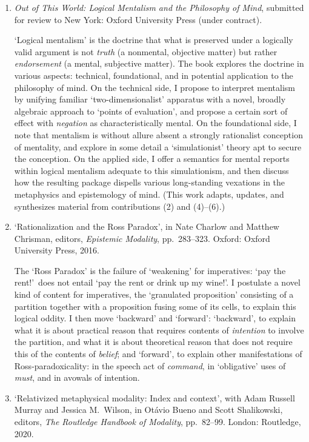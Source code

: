 \documentclass[12pt]{article}
\begin{document}
\begin{enumerate}
	\item \emph{Out of This World: Logical Mentalism and the Philosophy of Mind}, submitted for review to New York: Oxford University Press (under contract).
	
	`Logical mentalism' is the doctrine that what is preserved under a logically valid argument is not \emph{truth} (a nonmental, objective matter) but rather \emph{endorsement} (a mental, subjective matter). The book explores the doctrine in various aspects: technical, foundational, and in potential application to the philosophy of mind. On the technical side, I propose to interpret mentalism by unifying familiar `two-dimensionalist' apparatus with a novel, broadly algebraic approach to `points of evaluation', and propose a certain sort of effect with \emph{negation} as characteristically mental. On the foundational side, I note that mentalism is without allure absent a strongly rationalist conception of mentality, and explore in some detail a `simulationist' theory apt to secure the conception. On the applied side, I offer a semantics for mental reports within logical mentalism adequate to this simulationism, and then discuss how the resulting package dispells various long-standing vexations in the metaphysics and epistemology of mind. (This work adapts, updates, and synthesizes material from contributions (2) and (4)--(6).)
	
	
	\item `Rationalization and the Ross Paradox', in Nate Charlow and Matthew Chrisman, editors, \emph{Epistemic Modality}, pp.~283--323. Oxford: Oxford University Press, 2016.
	
	The `Ross Paradox' is the failure of `weakening' for imperatives: `pay the rent!'\ does not entail `pay the rent or drink up my wine!'. I postulate a novel kind of content for imperatives, the `granulated proposition' consisting of a partition together with a proposition fusing some of its cells, to explain this logical oddity. I then move `backward' and `forward': `backward', to explain what it is about practical reason that requires contents of \emph{intention} to involve the partition, and what it is about theoretical reason that does not require this of the contents of \emph{belief}; and `forward', to explain other manifestations of Ross-paradoxicality: in the speech act of \emph{command}, in `obligative' uses of \emph{must}, and in avowals of intention.
	
	\item `Relativized metaphysical modality: Index and context', with Adam Russell Murray and Jessica M.\ Wilson, in Ot\'avio Bueno and Scott Shalikowski, editors, \emph{The Routledge Handbook of Modality}, pp.~82--99. London: Routledge, 2020. 
	

\end{enumerate}
\end{document}
